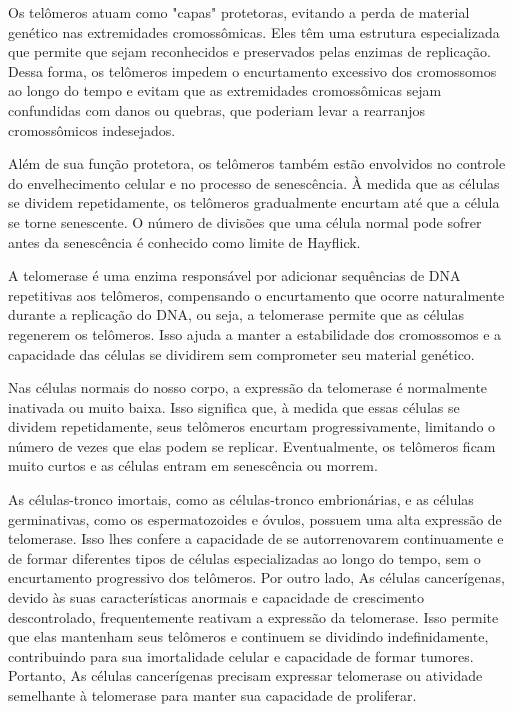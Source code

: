 \documentclass[11pt,a4paper]{article}
\begin{document}
    Os telômeros atuam como "capas" protetoras, evitando a perda de material genético nas extremidades cromossômicas. Eles têm uma estrutura especializada que permite que sejam reconhecidos e preservados pelas enzimas de replicação. Dessa forma, os telômeros impedem o encurtamento excessivo dos cromossomos ao longo do tempo e evitam que as extremidades cromossômicas sejam confundidas com danos ou quebras, que poderiam levar a rearranjos cromossômicos indesejados.

    Além de sua função protetora, os telômeros também estão envolvidos no controle do envelhecimento celular e no processo de senescência. À medida que as células se dividem repetidamente, os telômeros gradualmente encurtam até que a célula se torne senescente. O número de divisões que uma célula normal pode sofrer antes da senescência é conhecido como limite de Hayflick.

    A telomerase é uma enzima responsável por adicionar sequências de DNA repetitivas aos telômeros, compensando o encurtamento que ocorre naturalmente durante a replicação do DNA, ou seja, a telomerase permite que as células regenerem os telômeros. Isso ajuda a manter a estabilidade dos cromossomos e a capacidade das células se dividirem sem comprometer seu material genético.

    Nas células normais do nosso corpo, a expressão da telomerase é normalmente inativada ou muito baixa. Isso significa que, à medida que essas células se dividem repetidamente, seus telômeros encurtam progressivamente, limitando o número de vezes que elas podem se replicar. Eventualmente, os telômeros ficam muito curtos e as células entram em senescência ou morrem.

    As células-tronco imortais, como as células-tronco embrionárias, e as células germinativas, como os espermatozoides e óvulos, possuem uma alta expressão de telomerase. Isso lhes confere a capacidade de se autorrenovarem continuamente e de formar diferentes tipos de células especializadas ao longo do tempo, sem o encurtamento progressivo dos telômeros. Por outro lado, As células cancerígenas, devido às suas características anormais e capacidade de crescimento descontrolado, frequentemente reativam a expressão da telomerase. Isso permite que elas mantenham seus telômeros e continuem se dividindo indefinidamente, contribuindo para sua imortalidade celular e capacidade de formar tumores. Portanto, As células cancerígenas precisam expressar telomerase ou atividade semelhante à telomerase para manter sua capacidade de proliferar.

    








   


     
    
    




\end{document}
